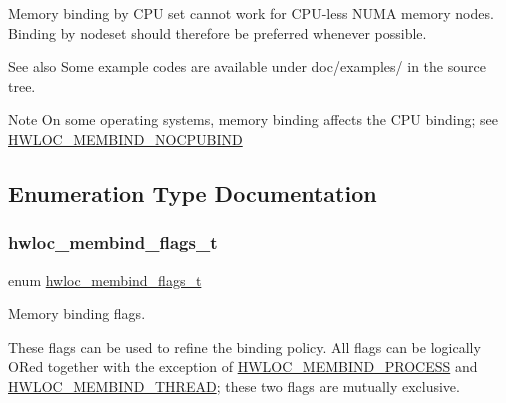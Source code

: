 Memory binding by C\+PU set cannot work for C\+P\+U-\/less N\+U\+MA memory nodes. Binding by nodeset should therefore be preferred whenever possible.

\begin{DoxySeeAlso}{See also}
Some example codes are available under doc/examples/ in the source tree.
\end{DoxySeeAlso}
\begin{DoxyNote}{Note}
On some operating systems, memory binding affects the C\+PU binding; see \hyperlink{a00191_ggab00475fd98815bf4fb9aaf752030e7d2aad6b9eaf2ee324ca58dc8f58094b9997}{H\+W\+L\+O\+C\+\_\+\+M\+E\+M\+B\+I\+N\+D\+\_\+\+N\+O\+C\+P\+U\+B\+I\+ND} 
\end{DoxyNote}


\subsection{Enumeration Type Documentation}
\mbox{\label{a00191_gab00475fd98815bf4fb9aaf752030e7d2}} 
\subsubsection{\texorpdfstring{hwloc\+\_\+membind\+\_\+flags\+\_\+t}{hwloc\_membind\_flags\_t}}
{\footnotesize\ttfamily enum \hyperlink{a00191_gab00475fd98815bf4fb9aaf752030e7d2}{hwloc\+\_\+membind\+\_\+flags\+\_\+t}}



Memory binding flags. 

These flags can be used to refine the binding policy. All flags can be logically OR\textquotesingle{}ed together with the exception of \hyperlink{a00191_ggab00475fd98815bf4fb9aaf752030e7d2a1b1b74aef138f64aff214a8cbdfe8eb4}{H\+W\+L\+O\+C\+\_\+\+M\+E\+M\+B\+I\+N\+D\+\_\+\+P\+R\+O\+C\+E\+SS} and \hyperlink{a00191_ggab00475fd98815bf4fb9aaf752030e7d2a1dc7dd5cdcd5796893a325a524555298}{H\+W\+L\+O\+C\+\_\+\+M\+E\+M\+B\+I\+N\+D\+\_\+\+T\+H\+R\+E\+AD}; these two flags are mutually exclusive.

